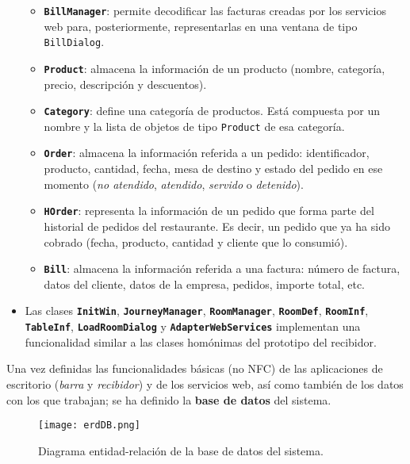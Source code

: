 \begin{itemize}
\begin{itemize}
  \item \textbf{\texttt{BillManager}}: permite decodificar las facturas creadas 
  por los servicios web para, posteriormente, representarlas en una ventana de 
  tipo \texttt{BillDialog}.
  \item \textbf{\texttt{Product}}: almacena la información de un producto 
  (nombre, categoría, precio, descripción y descuentos).
  \item \textbf{\texttt{Category}}: define una categoría de productos. Está 
  compuesta por un nombre y la lista de objetos de tipo \texttt{Product} de esa
  categoría.
  \item \textbf{\texttt{Order}}: almacena la información referida a un pedido:
  identificador, producto, cantidad, fecha, mesa de destino y estado del
  pedido en ese momento (\emph{no atendido}, \emph{atendido}, \emph{servido}
  o \emph{detenido}).
  \item \textbf{\texttt{HOrder}}: representa la información de un pedido que 
  forma parte del historial de pedidos del restaurante. Es decir, un pedido que 
  ya ha sido cobrado (fecha, producto, cantidad y cliente que lo consumió).
  \item \textbf{\texttt{Bill}}: almacena la información referida a una factura:
  número de factura, datos del cliente, datos de la empresa, pedidos, importe
  total, etc.
  \end{itemize}
\item Las clases \textbf{\texttt{InitWin}}, \textbf{\texttt{JourneyManager}},
\textbf{\texttt{RoomManager}}, \textbf{\texttt{RoomDef}},
\textbf{\texttt{RoomInf}}, \textbf{\texttt{TableInf}},
\textbf{\texttt{LoadRoomDialog}} y \textbf{\texttt{AdapterWebServices}} 
implementan una funcionalidad similar a las clases homónimas del prototipo del 
recibidor.
\end{itemize}

Una vez definidas las funcionalidades básicas (no \acs{NFC}) de las
aplicaciones de escritorio (\emph{barra} y \emph{recibidor}) y de los servicios 
web, así como también de los datos con los que trabajan; se ha definido la 
\textbf{base de datos} del sistema.

  \begin{figure}[H]
    \begin{center}
      \texttt{[image: erdDB.png]}
      \caption{Diagrama entidad-relación de la base de datos del sistema.}
      \label{fig:erdDB}
    \end{center}
  \end{figure}

